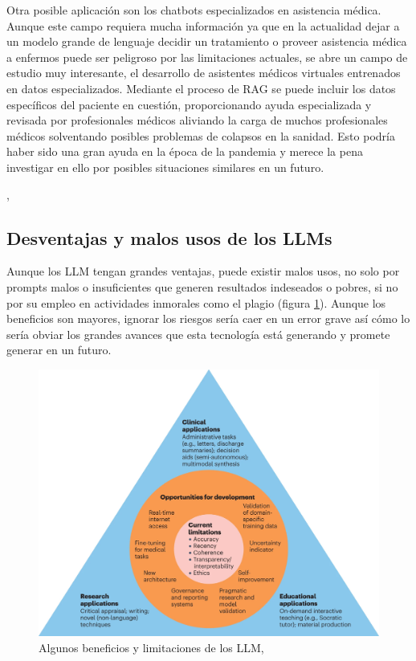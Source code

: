 Otra posible aplicación son los chatbots especializados en asistencia médica. Aunque este campo requiera mucha información ya que en la actualidad dejar a un modelo grande de lenguaje decidir un tratamiento o proveer asistencia médica a enfermos puede ser peligroso por las limitaciones actuales, se abre un campo de estudio muy interesante, el desarrollo de asistentes médicos virtuales entrenados en datos especializados. Mediante el proceso de RAG se puede incluir los datos específicos del paciente en cuestión, proporcionando ayuda especializada y revisada por profesionales médicos aliviando la carga de muchos profesionales médicos solventando posibles problemas de colapsos en la sanidad. Esto podría haber sido una gran ayuda en la época de la pandemia y merece la pena investigar en ello por posibles situaciones similares en un futuro.

\cite{kim_chatgpt_2023}, \cite{clusmann_future_2023}

\subsection{Desventajas y malos usos de los LLMs}

Aunque los LLM tengan grandes ventajas, puede existir malos usos, no solo por prompts malos o insuficientes que generen resultados indeseados o pobres, si no por su empleo en actividades inmorales como el plagio (figura \ref{fig:prosandcons}). Aunque los beneficios son mayores, ignorar los riesgos sería caer en un error grave así cómo lo sería obviar los grandes avances que esta tecnología está generando y promete generar en un futuro.

\begin{figure}[h]
    \centering
    \includegraphics[width=1\textwidth]{img/pros_and_cons.jpg}
    \caption{Algunos beneficios y limitaciones de los LLM, \cite{thirunavukarasu_large_2023}}
    \label{fig:prosandcons}
\end{figure}


